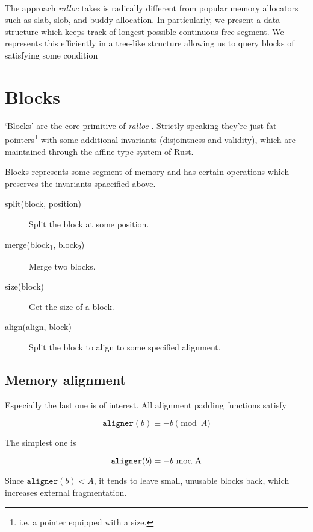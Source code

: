\documentclass[11pt]{article}
\newcommand{\emod}{\ \rm mod \ }
\newcommand{\ralloc}{\emph{ralloc} }
\begin{document}
    \

    The approach \ralloc takes is radically different from popular memory
    allocators such as slab\cite{bonwick94}, slob\cite{mackall05}, and buddy
    allocation\cite{knowlton65}. In particularly, we present a data structure
    which keeps track of longest possible continuous free segment. We
    represents this efficiently in a tree-like structure allowing us to query
    blocks of satisfying some condition


    \section{Blocks}
    `Blocks' are the core primitive of \ralloc. Strictly speaking they're just
    fat pointers\footnote{i.e. a pointer equipped with a size.} with some
    additional invariants (disjointness and validity), which are maintained
    through the affine type system of Rust.

    Blocks represents some segment of memory and has certain operations which
    preserves the invariants spaecified above.

    \begin{description}
        \item [split(block, position)] Split the block at some position.
        \item [merge(block\textsubscript{1}, block\textsubscript{2})] Merge two
            blocks.
        \item [size(block)] Get the size of a block.
        \item [align(align, block)] Split the block to align to some specified
            alignment.
    \end{description}

    \subsection{Memory alignment}
    Especially the last one is of interest. All alignment padding functions
    satisfy

    $$
        \mathtt{aligner}(b) \equiv -b \pmod A
    $$

    The simplest one is

    $$
        \mathtt{aligner}(b) = -b \emod A
    $$

    Since $ \mathtt{aligner}(b) < A $, it tends to leave small, unusable blocks
    back, which increases external fragmentation.
\end{document}
